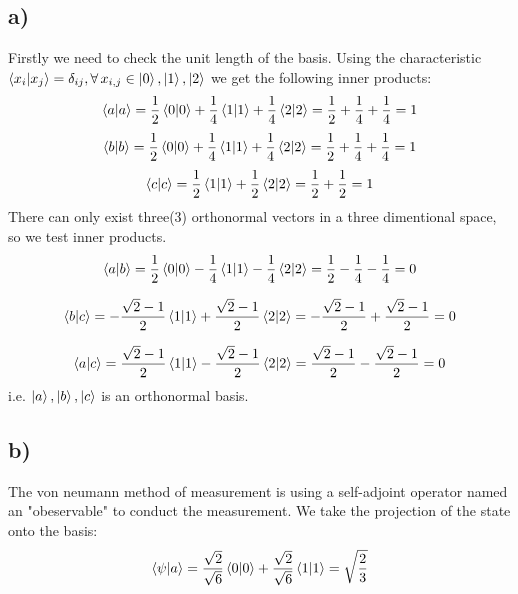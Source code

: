 \documentclass[11pt,a4paper]{article}
\begin{document}
\subsection*{a)}
Firstly we need to check the unit length of the basis.
Using the characteristic $\braket{x_i|x_j} = \delta_{ij},\forall\, x_{i,j} \in \ket{0},\ket{1},\ket{2}$ we get the following inner products:
\begin{equation}
    \braket{a|a} = \frac{1}{2}\braket{0|0} + \frac{1}{4}\braket{1|1} + \frac{1}{4}\braket{2|2} = \frac{1}{2} + \frac{1}{4} + \frac{1}{4} = 1
\end{equation}
\begin{equation}
    \braket{b|b} = \frac{1}{2}\braket{0|0} + \frac{1}{4}\braket{1|1} + \frac{1}{4}\braket{2|2} = \frac{1}{2} + \frac{1}{4} + \frac{1}{4} = 1
\end{equation}
\begin{equation}
    \braket{c|c} =  \frac{1}{2}\braket{1|1} + \frac{1}{2}\braket{2|2} = \frac{1}{2} + \frac{1}{2} = 1
\end{equation}
There can only exist three(3) orthonormal vectors in a three dimentional space, so we test inner products.
\begin{equation}
    \braket{a|b} = \frac{1}{2}\braket{0|0} - \frac{1}{4}\braket{1|1} - \frac{1}{4}\braket{2|2} = \frac{1}{2} - \frac{1}{4}-\frac{1}{4} = 0
\end{equation}

\begin{equation}
    \braket{b|c} = -\frac{\sqrt{2}-1}{2}\braket{1|1} + \frac{\sqrt{2}-1}{2}\braket{2|2} = -\frac{\sqrt{2}-1}{2}+\frac{\sqrt{2}-1}{2} = 0
\end{equation}

\begin{equation}
    \braket{a|c} = \frac{\sqrt{2}-1}{2}\braket{1|1} - \frac{\sqrt{2}-1}{2}\braket{2|2} = \frac{\sqrt{2}-1}{2}-\frac{\sqrt{2}-1}{2} = 0
\end{equation}
i.e. $\ket{a},\ket{b},\ket{c}$ is an orthonormal basis.

\subsection*{b)}
The von neumann method of measurement is using a self-adjoint operator named an "obeservable" to conduct the measurement. 
We take the projection of the state onto the basis:
\begin{equation}
    \braket{\psi|a} = \frac{\sqrt{2}}{\sqrt{6}}\braket{0|0} + \frac{\sqrt{2}}{\sqrt{6}}\braket{1|1} = \sqrt{\frac{2}{3}}
\end{equation}
\end{document}
